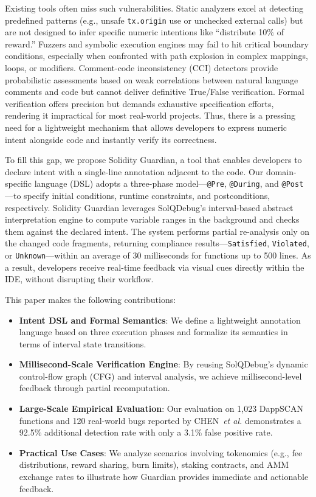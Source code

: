 \documentclass[10pt, conference]{IEEEtran}
\begin{document}
Existing tools often miss such vulnerabilities.  
Static analyzers excel at detecting predefined patterns (e.g., unsafe \texttt{tx.origin} use or unchecked external calls) but are not designed to infer specific numeric intentions like “distribute 10\% of reward.”  
Fuzzers and symbolic execution engines may fail to hit critical boundary conditions, especially when confronted with path explosion in complex mappings, loops, or modifiers.  
Comment-code inconsistency (CCI) detectors provide probabilistic assessments based on weak correlations between natural language comments and code but cannot deliver definitive True/False verification.  
Formal verification offers precision but demands exhaustive specification efforts, rendering it impractical for most real-world projects.  
Thus, there is a pressing need for a lightweight mechanism that allows developers to express numeric intent alongside code and instantly verify its correctness.

To fill this gap, we propose Solidity Guardian, a tool that enables developers to declare intent with a single-line annotation adjacent to the code.  
Our domain-specific language (DSL) adopts a three-phase model—\texttt{@Pre}, \texttt{@During}, and \texttt{@Post}—to specify initial conditions, runtime constraints, and postconditions, respectively. Solidity Guardian leverages SolQDebug's interval-based abstract interpretation engine to compute variable ranges in the background and checks them against the declared intent.  
The system performs partial re-analysis only on the changed code fragments, returning compliance results—\texttt{Satisfied}, \texttt{Violated}, or \texttt{Unknown}—within an average of 30 milliseconds for functions up to 500 lines.  
As a result, developers receive real-time feedback via visual cues directly within the IDE, without disrupting their workflow.

This paper makes the following contributions:
\begin{itemize}
    \item \textbf{Intent DSL and Formal Semantics}: We define a lightweight annotation language based on three execution phases and formalize its semantics in terms of interval state transitions.
    \item \textbf{Millisecond-Scale Verification Engine}: By reusing SolQDebug’s dynamic control-flow graph (CFG) and interval analysis, we achieve millisecond-level feedback through partial recomputation.
    \item \textbf{Large-Scale Empirical Evaluation}: Our evaluation on 1,023 DappSCAN functions and 120 real-world bugs reported by CHEN~\textit{et al.} demonstrates a 92.5\% additional detection rate with only a 3.1\% false positive rate.
    \item \textbf{Practical Use Cases}: We analyze scenarios involving tokenomics (e.g., fee distributions, reward sharing, burn limits), staking contracts, and AMM exchange rates to illustrate how Guardian provides immediate and actionable feedback.
\end{itemize}
\end{document}
